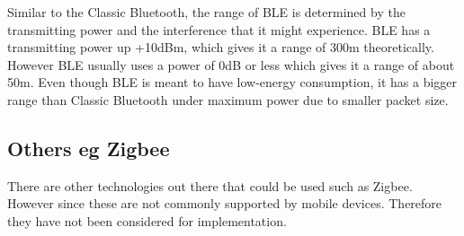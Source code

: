 Similar to the Classic Bluetooth, the range of BLE is determined by
the transmitting power and the interference that it might experience.
BLE has a transmitting power up +10dBm, which gives it a range of
300m theoretically\cite{bluetooth-chalmers}. However BLE usually uses a power of 0dB or less
which gives it a range of about 50m. Even though BLE is meant to have
low-energy consumption, it has a bigger range than Classic Bluetooth
under maximum power due to smaller packet size. 


\subsection{Others eg Zigbee}

There are other technologies out there that could be used such
as Zigbee\cite{zigbee}. However since these are not commonly supported by mobile
devices. Therefore they have not been considered for implementation.




